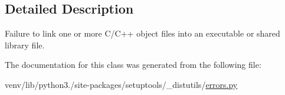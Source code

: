 \subsection{Detailed Description}
\begin{DoxyVerb}Failure to link one or more C/C++ object files into an executable
or shared library file.\end{DoxyVerb}
 

The documentation for this class was generated from the following file\+:\begin{DoxyCompactItemize}
\item 
venv/lib/python3./site-\/packages/setuptools/\+\_\+distutils/\hyperlink{__distutils_2errors_8py}{errors.\+py}\end{DoxyCompactItemize}
